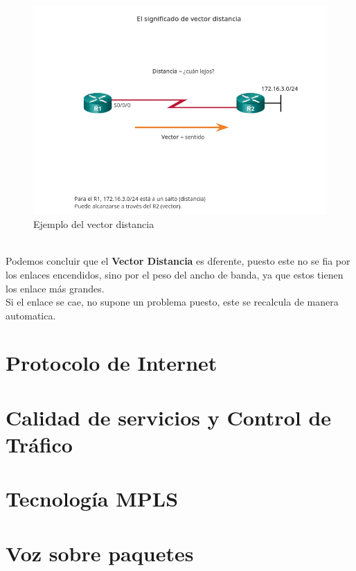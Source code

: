 \documentclass[a4paper]{report} %
\begin{document}
              \paragraph{}\mbox{}\\
                \begin{figure}[htb]
                  \centering
                    \includegraphics[width=\textwidth]{Images/vector-distancia.png}
                      \caption{Ejemplo del vector distancia}
                      \label{fig:vector-distancia}
                \end{figure}
              \\Podemos concluir que el \textbf{Vector Distancia} es dferente, puesto este no se fia por los enlaces encendidos, sino por el peso del ancho de banda, ya que estos tienen los enlace más grandes.
              \\Si el enlace se cae, no supone un problema puesto, este se recalcula de manera automatica.
    \part{Protocolo de Internet}
    \part{Calidad de servicios y Control de Tráfico}
    \part{Tecnología MPLS}
    \part{Voz sobre paquetes}
\end{document}

